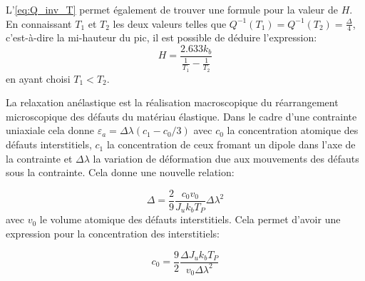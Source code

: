 L'\autoref{eq:Q_inv_T} permet également de trouver une formule pour la valeur de $H$. En connaissant $T_1$ et $T_2$ les deux valeurs telles que $Q^{-1}(T_1) = Q^{-1}(T_2) = \frac{\Delta}{4}$, c'est-à-dire la mi-hauteur du pic, il est possible de déduire l'expression:
\begin{equation}
    H = \frac{2.633 k_b}{\frac{1}{T_1} - \frac{1}{T_2}}
    \label{eq:H_mi_hauteur}
\end{equation}
en ayant choisi $T_1 < T_2$.


La relaxation anélastique est la réalisation macroscopique du réarrangement microscopique des défauts du matériau élastique. Dans le cadre d'une contrainte uniaxiale cela donne \hbox{$\varepsilon_a = \Delta\lambda\left(c_1 - c_0/3\right)$} avec $c_0$ la concentration atomique des défauts interstitiels, $c_1$ la concentration de ceux fromant un dipole dans l'axe de la contrainte et $\Delta\lambda$ la variation de déformation due aux mouvements des défauts sous la contrainte. Cela donne une nouvelle relation:

\begin{equation}
    \Delta = \frac{2}{9}\frac{c_0 v_0}{J_u k_b T_P}\Delta\lambda^2
    \label{eq:delta_defauts}
\end{equation}
avec $v_0$ le volume atomique des défauts interstitiels.
Cela permet d'avoir une expression pour la concentration des interstitiels:

\begin{equation}
    c_0 = \frac{9}{2}\frac{\Delta J_u k_b T_P}{v_0 \Delta \lambda^2}
    \label{eq:c_0}
\end{equation}

